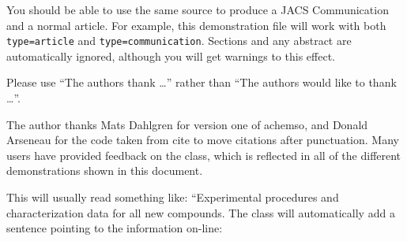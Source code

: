 \documentclass[journal=jpca,manuscript=article]{achemso}
\begin{document}
You should be able to use the same source to produce a JACS
Communication and a normal article.  For example, this demonstration
file will work with both \texttt{type=article} and
\texttt{type=communication}. Sections and any abstract are
automatically ignored, although you will get warnings to this effect.

\begin{acknowledgement}

Please use ``The authors thank \ldots'' rather than ``The
authors would like to thank \ldots''.

The author thanks Mats Dahlgren for version one of \textsf{achemso},
and Donald Arseneau for the code taken from \textsf{cite} to move
citations after punctuation. Many users have provided feedback on the
class, which is reflected in all of the different demonstrations
shown in this document.

\end{acknowledgement}

\begin{suppinfo}

This will usually read something like: ``Experimental procedures and
characterization data for all new compounds. The class will
automatically add a sentence pointing to the information on-line:

\end{suppinfo}


\end{document}
